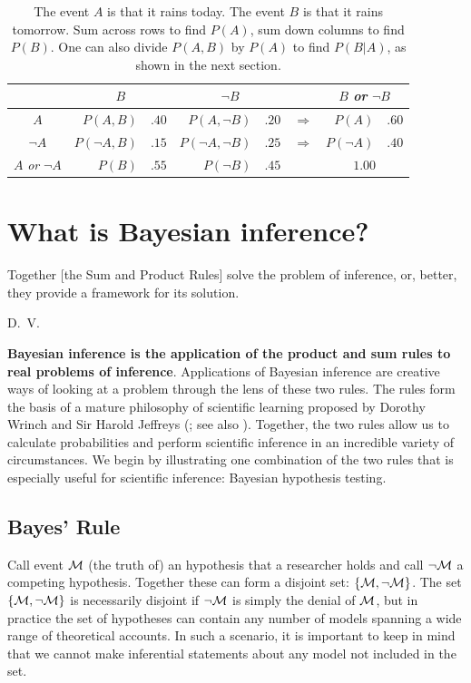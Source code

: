 \begin{table}[bt]
\caption{The event $A$ is that it rains today. The event $B$ is that it rains tomorrow. Sum across rows to find $P(A)$, sum down columns to find $P(B)$. One can also divide $P(A,B)$ by $P(A)$ to find $P(B|A)$, as shown in the next section.}
\label{tab:prob}\centering
\begin{tabular}{cr@{ = }lr@{ = }lcr@{ = }l}
 & \multicolumn{2}{c}{$B$} & \multicolumn{2}{c}{$\neg{B}$} & &\multicolumn{2}{c}{$B$ \textit{or} $\neg{B}$}
 \\[0.5ex]
\hline
$A$ & $P(A,B)$ & $.40$ & $P(A,\neg{B})$ & $.20$ & $\Rightarrow$ & $P(A)$ & $.60$\\
$\neg{A}$ & $P(\neg{A},B)$ & $.15$ & $P(\neg{A},\neg{B})$ & $.25$ & $\Rightarrow$ & $P(\neg A)$ & $.40$ \\[0.5ex] 
$A$ \textit{or} $\neg A$ & $P(B)$ & $.55$ & $P(\neg B)$ & $.45$ && \multicolumn{2}{c}{$1.00$} \\[0.5ex]\hline
\end{tabular}
\end{table}
 
\section*{What is Bayesian inference?}
\epigraph{Together [the Sum and Product Rules] solve the problem of inference, or, better, they provide a framework for its solution.}{D.~V.~}

\noindent \textbf{Bayesian inference is the application of the product and sum rules to real problems of inference}. Applications of Bayesian inference are creative ways of looking at a problem through the lens of these two rules. The rules form the basis of a mature philosophy of scientific learning {proposed} by Dorothy Wrinch and Sir Harold Jeffreys  (; see also ). Together, the two rules allow us to calculate probabilities and perform scientific inference in an incredible variety of circumstances. We begin by illustrating one combination of the two rules that is especially useful for scientific inference: Bayesian hypothesis testing.

\subsection*{Bayes' Rule}
Call event ${\cal M}$ (the truth of) an hypothesis that a researcher holds and call $\neg{{\cal M}}$ a competing hypothesis. 
Together these {can} form a disjoint set: $\{{\cal M},\neg{{\cal M}}\}$. The set $\{{\cal M},\neg{{\cal M}}\}$ is necessarily disjoint if $\neg{{\cal M}}$ is simply the denial of ${\cal M}$, but in practice the set of hypotheses can contain any number of models spanning a wide range of theoretical accounts. In such a scenario, it is important to keep in mind that we cannot make inferential statements about any model not included in the set.

